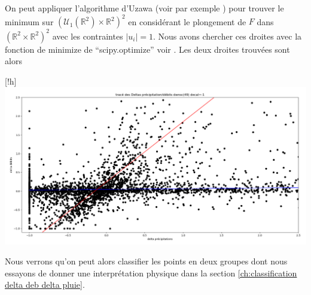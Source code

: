 \documentclass[a4paper,11pt]{article}
\begin{document}
On peut appliquer l'algorithme d'Uzawa (voir par exemple \cite{boyd2004convex}) pour trouver le minimum sur  $(\mathcal{U}_1(\mathbb{R}^2)\times\mathbb{R}^2)^2$ en considérant le plongement de $F$ dans  $(\mathbb{R}^2\times\mathbb{R}^2)^2$ avec les contraintes $|u_i|=1$. Nous avons chercher ces droites avec la fonction de minimize de ``scipy.optimize'' voir \cite{scipy}. Les deux droites trouvées sont alors 

\begin{center}[!h]
	\captionsetup{type=figure}
	\includegraphics[scale=0.28]{images/deb_prec_dec1_droites.png}
\end{center}

Nous verrons qu'on peut alors classifier les points en deux groupes dont nous essayons de donner une interprétation physique dans la section \ref{ch:classification delta deb delta pluie}.  

\newpage


\end{document}
